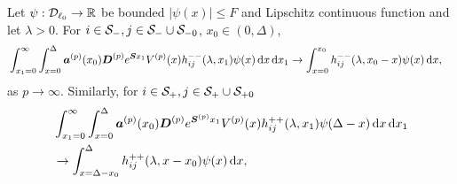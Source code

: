 
\begin{lem}\label{lem: ppp}
	Let \(\psi:\mathcal{D}_{\ell_0}\to \mathbb R\) be bounded \(|\psi(x)|\leq F\) and Lipschitz continuous function and let \(\lambda >0\). For \(i\in\mathcal S_-,j\in\mathcal S_-\cup\mathcal{S}_{-0}\), \(x_0\in(0,\Delta)\), 
	\begin{align}
		&\int_{x_1=0}^\infty \int_{x=0}^{\Delta}\boldsymbol a^{(p)}(x_0) \boldsymbol D^{(p)} e^{\boldsymbol S x_1} V^{(p)}(x) h_{ij}^{--}(\lambda, x_1) \psi(x) \, \mathrm{d} x \, \mathrm{d} x_1  
		\to \int_{x=0}^{x_0} h_{ij}^{--}(\lambda,x_0-x)\psi(x)\, \mathrm{d} x, \label{eqn: LLLlllL}
	\end{align}
	as \(p\to\infty\). Similarly, for \(i\in\mathcal S_+,j\in\mathcal S_+\cup\mathcal{S}_{+0}\)
	\begin{align}
		&\int_{x_1=0}^\infty \int_{x=0}^{\Delta}\boldsymbol a^{(p)}(x_0) \boldsymbol D^{(p)} e^{\boldsymbol S^{(p)} x_1} V^{(p)}(x) h_{ij}^{++}(\lambda, x_1) \psi(\Delta-x) \, \mathrm{d} x \, \mathrm{d} x_1  \nonumber 
		\\&\to\int_{x=\Delta-x_0}^{\Delta} h_{ij}^{++}(\lambda,x-x_0)\psi(x)\, \mathrm{d} x, \label{eqn: LLLlllL2222}
	\end{align}
\end{lem}
